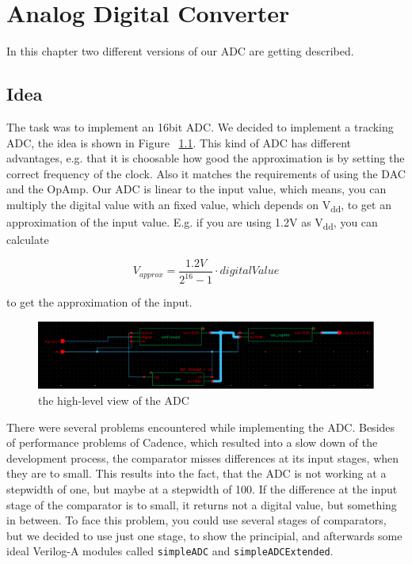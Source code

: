 \chapter{Analog Digital Converter}

In this chapter two different versions of our ADC are getting described.

\section{Idea}

The task was to implement an 16bit ADC. We decided to implement a tracking ADC, the idea is shown in Figure ~\ref{fig:wholeADC}. This kind of ADC has different advantages, e.g. that it is choosable how good the approximation is by setting the correct frequency of the clock. Also it matches the requirements of using the DAC and the OpAmp. Our ADC is linear to the input value, which means, you can multiply the digital value with an fixed value, which depends on V\textsubscript{dd}, to get an approximation of the input value. E.g. if you are using 1.2V as V\textsubscript{dd}, you can calculate 

\begin{equation}
	V_{approx} = \frac{1.2V}{2^{16} - 1} \cdot digitalValue
\end{equation}

to get the approximation of the input.

\begin{figure}[h]
	\centering
	\includegraphics[scale=0.5]{images/adc/adc.png}
	\caption{the high-level view of the ADC}
	\label{fig:wholeADC}
\end{figure} 

There were several problems encountered while implementing the ADC. Besides of performance problems of Cadence, which resulted into a slow down of the development process, the comparator misses differences at its input stages, when they are to small. This results into the fact, that the ADC is not working at a stepwidth of one, but maybe at a stepwidth of 100. If the difference at the input stage of the comparator is to small, it returns not a digital value, but something in between. To face this problem, you could use several stages of comparators, but we decided to use just one stage, to show the principial, and afterwards some ideal Verilog-A modules called \texttt{simpleADC} and \texttt{simpleADCExtended}. 

